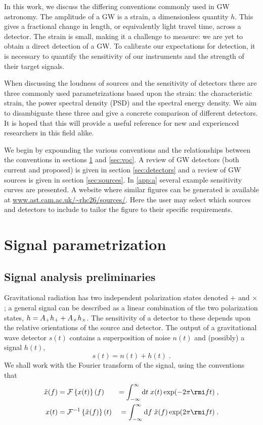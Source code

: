 In this work, we discuss the differing conventions commonly used in GW astronomy. The amplitude of a GW is a strain, a dimensionless quantity $h$. This gives a fractional change in length, or equivalently light travel time, across a detector. The strain is small, making it a challenge to measure: we are yet to obtain a direct detection
of a GW. To calibrate our expectations for detection, it is necessary to quantify the sensitivity of our instruments and the strength of their target signals.

When discussing the loudness of sources and the sensitivity of detectors there are three commonly used parametrizations based upon the strain: the characteristic strain, the power spectral density (PSD) and the spectral energy density. We aim to disambiguate these three and give a concrete comparison of different detectors. It is hoped that this will provide a useful reference for new and experienced researchers in this field alike. 

We begin by expounding the various conventions and the relationships between the conventions in sections \ref{sec:conventions} and \ref{sec:voc}. A review of GW detectors (both current and proposed) is given in section \ref{sec:detectors} and a review of GW sources is given in section \ref{sec:sources}. In \ref{app:a} several example sensitivity curves are presented. A website where similar figures can be generated is available at \url{www.ast.cam.ac.uk/~rhc26/sources/}. Here the user may select which sources and detectors to include to tailor the figure to their specific requirements.


\section{Signal parametrization}\label{sec:conventions}

\subsection{Signal analysis preliminaries}

Gravitational radiation has two independent polarization states denoted $+$ and $\times$; a general signal can be described as a linear combination of the two polarization states, $h \nobreak=\nobreak A_{+} h_{+}\nobreak +\nobreak A_{\times} h_{\times}$. The sensitivity of a detector to these depends upon the relative orientations of the source and detector. The output of a gravitational wave detector $s(t)$ contains a superposition of noise $n(t)$ and (possibly) a signal $h(t)$,
\begin{equation}
s(t) = n(t)+h(t) \; .
\end{equation}
We shall work with the Fourier transform of the signal, using the conventions that
\begin{eqnarray} \label{eq:defFourier}
\tilde{x}(f) &= {\mathcal{F}}\left\{x(t)\right\}(f) &= \int_{-\infty}^{\infty}\mathrm{d}t\;x(t)\exp (-2\pi \rmi f t ) \; , \\
x(t) &= {\mathcal{F}}^{-1}\left\{\tilde{x}(f)\right\}(t) &= \int_{-\infty}^{\infty}\mathrm{d}f\;\tilde{x}(f)\exp (2\pi \rmi f t ) \; .
\end{eqnarray}

